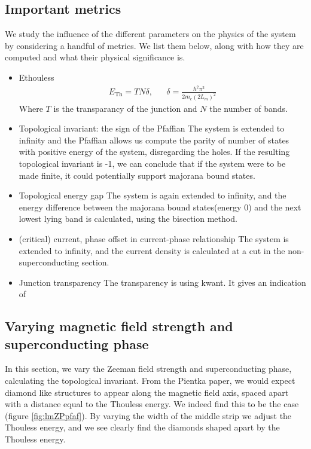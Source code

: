 \documentclass[10pt,a4paper]{article}
\begin{document}
	\subsection{Important metrics}
	We study the influence of the different parameters on the physics of the system by considering a handful of metrics. We list them below, along with how they are computed and what their physical significance is.
		\begin{itemize}
			\item \Gls{Ethouless}
				\begin{align}\label{eq:thouless}
				E_\text{Th} = TN\delta
				, && \delta = \frac{\hbar^2 \pi^2}
				{2 m_e \left( 2 L_m \right)^2}
				\end{align}
			Where $T$ is the transparancy of the junction and $N$ the number of bands.
			\item Topological invariant: the sign of the Pfaffian
				\subitem The system is extended to infinity and the Pfaffian allows us compute the parity of number of states with positive energy of the system, disregarding the holes. If the resulting topological invariant is -1, we can conclude that if the system were to be made finite, it could potentially support majorana bound states.

			\item Topological energy gap
				\subitem The system is again extended to infinity, and the energy difference between the majorana bound states(energy 0) and the next lowest lying band is calculated, using the bisection method.
				
			\item (critical) current, phase offset in current-phase relationship
				\subitem The system is extended to infinity, and the current density is calculated at a cut in the non-superconducting section.
			
			\item Junction transparency
				\subitem The transparency is using kwant. It gives an indication of 
		\end{itemize}
\newpage
	\subsection{Varying magnetic field strength and superconducting phase}
		In this section, we vary the Zeeman field strength and superconducting phase, calculating the topological invariant.
		From the Pientka paper, we would expect diamond like structures to appear along the magnetic field axis, spaced apart with a distance equal to the Thouless energy.
		We indeed find this to be the case (figure \ref{fig:lmZPpfaf}).
		By varying the width of the middle strip we adjust the Thouless energy, and we see clearly find the diamonds shaped apart by the Thouless energy.
		
\end{document}
